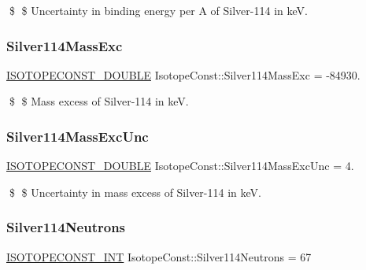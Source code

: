 \$ \$ Uncertainty in binding energy per A of Silver-\/114 in keV. \mbox{\label{group___isotope_const-_silver-_ag114_ga3e222af0f558178d30cff78fc8fc9ea2}} 
\subsubsection{\texorpdfstring{Silver114\+Mass\+Exc}{Silver114MassExc}}
{\footnotesize\ttfamily \mbox{\hyperlink{group___isotope_const-_macros_ga8f45a7272ce02c0b4c65c44636ed719a}{I\+S\+O\+T\+O\+P\+E\+C\+O\+N\+S\+T\+\_\+\+D\+O\+U\+B\+LE}} Isotope\+Const\+::\+Silver114\+Mass\+Exc = -\/84930.}

\$ \$ Mass excess of Silver-\/114 in keV. \mbox{\label{group___isotope_const-_silver-_ag114_ga5e1e64c0d445cc49d7d542f038bce4ce}} 
\subsubsection{\texorpdfstring{Silver114\+Mass\+Exc\+Unc}{Silver114MassExcUnc}}
{\footnotesize\ttfamily \mbox{\hyperlink{group___isotope_const-_macros_ga8f45a7272ce02c0b4c65c44636ed719a}{I\+S\+O\+T\+O\+P\+E\+C\+O\+N\+S\+T\+\_\+\+D\+O\+U\+B\+LE}} Isotope\+Const\+::\+Silver114\+Mass\+Exc\+Unc = 4.}

\$ \$ Uncertainty in mass excess of Silver-\/114 in keV. \mbox{\label{group___isotope_const-_silver-_ag114_gae67d0271330b46838e2ad3d2c1fa80b6}} 
\subsubsection{\texorpdfstring{Silver114\+Neutrons}{Silver114Neutrons}}
{\footnotesize\ttfamily \mbox{\hyperlink{group___isotope_const-_macros_ga5f18360b3e99483a35c32d789e62621c}{I\+S\+O\+T\+O\+P\+E\+C\+O\+N\+S\+T\+\_\+\+I\+NT}} Isotope\+Const\+::\+Silver114\+Neutrons = 67}

